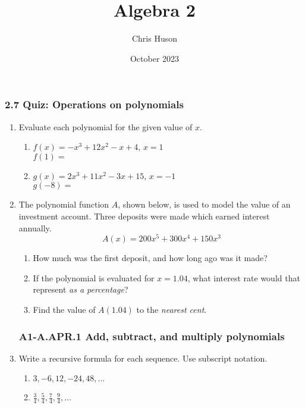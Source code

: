 \documentclass[12pt, twoside]{article}
\title{Algebra 2}
\author{Chris Huson}
\date{October 2023}
\begin{document}
\subsubsection*{2.7 Quiz: Operations on polynomials}
\begin{enumerate}
    \item Evaluate each polynomial for the given value of $x$.
    \begin{multicols}{2}
        \begin{enumerate}[itemsep=1cm]
            \item $f(x)=-x^3+12x^2-x+4$, $x=1$ \\[0.25cm] 
            $f(1) = $ \vspace{2cm}
            \item $g(x)=2x^3+11x^2-3x+15$, $x=-1$ \\[0.25cm] 
            $g(-8) = $ \vspace{2cm}
        \end{enumerate}
        \end{multicols}
    
    \item The polynomial function $A$, shown below, is used to model the value of an investment account. Three deposits were made which earned interest annually.  $$A(x)=200x^5+300x^4+150x^3$$ 
    \begin{enumerate}[itemsep=1cm]
        \item How much was the first deposit, and how long ago was it made? \vspace{1cm}
        \item If the polynomial is evaluated for $x = 1.04$, what interest rate would that represent \emph{as a percentage}?
        \item Find the value of $A(1.04)$ to the \emph{nearest cent}. \vspace{2cm}
    \end{enumerate}

\subsubsection*{A1-A.APR.1 Add, subtract, and multiply polynomials}
\item Write a recursive formula for each sequence. Use subscript notation.
    \begin{multicols}{2}
    \begin{enumerate}
        \item $3, -6, 12, -24, 48, \dots$
        \item $\displaystyle \frac{3}{4}, \frac{5}{4}, \frac{7}{4}, \frac{9}{4},  \dots$ 
    \end{enumerate}
    \end{multicols}


\end{enumerate}
\end{document}
